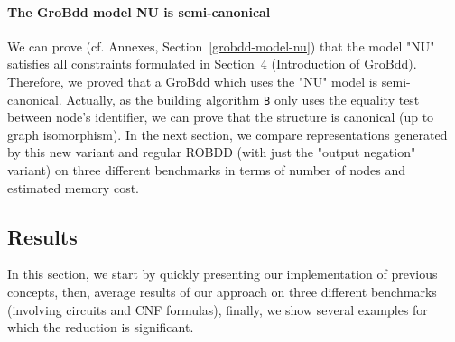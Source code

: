 \documentclass[a4paper,10pt]{article}
\begin{document}
  
\paragraph{The GroBdd model NU is semi-canonical}
We can prove (cf. Annexes, Section~\ref{grobdd-model-nu}) that the model "NU" satisfies all constraints formulated in Section~4 (Introduction of GroBdd).
Therefore, we proved that a GroBdd which uses the "NU" model is semi-canonical.
Actually, as the building algorithm \texttt{B} only uses the equality test between node's identifier, we can prove that the structure is canonical (up to graph isomorphism).
In the next section, we compare representations generated by this new variant and regular ROBDD (with just the "output negation" variant) on three different benchmarks in terms of number of nodes and estimated memory cost.

\subsection{Results}
In this section, we start by quickly presenting our implementation of previous concepts, then, average results of our approach on three different benchmarks (involving circuits and CNF formulas), finally, we show several examples for which the reduction is significant.
\end{document}
